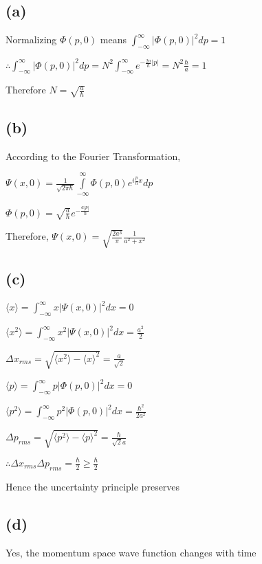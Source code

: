 \documentclass[12pt]{article}
\begin{document}
\begin{spacing}{2.0}
\section{} %
\subsection*{(a)}
Normalizing $\Phi(p,0)$ means $\int_{-\infty}^{\infty} |\Phi(p,0)|^2 dp=1$

$\therefore \int_{-\infty}^{\infty} |\Phi(p,0)|^2 dp= N^2\int_{-\infty}^{\infty}e^{-\frac{2a}{\hbar}|p|}= N^2\frac{\hbar}{a}=1$

Therefore $N=\sqrt{\frac{a}{\hbar}}$

\subsection*{(b)}
According to the Fourier Transformation,

$\Psi(x,0) = \frac{1}{\sqrt{2\pi \hbar}} \int\limits_{-\infty}^{\infty} \Phi(p,0) e^{i\frac{p}{\hbar}x} dp$

$\Phi(p,0)=\sqrt{\frac{a}{\hbar }} e^{-\frac{a \left| p\right| }{\hbar }}$

Therefore, $\Psi(x,0)= \sqrt{\frac{2a^3}{\pi}}\frac{1}{a^2+x^2}$

\subsection*{(c)}
$\langle x \rangle=\int_{-\infty}^{\infty} x|\Psi(x,0)|^2 dx=0$

$\langle x^2 \rangle=\int_{-\infty}^{\infty} x^2|\Psi(x,0)|^2 dx=\frac{a^2}{2}$

$\Delta x_{rms}=\sqrt{\langle x^2 \rangle- \langle x \rangle^2}= \frac{a}{\sqrt{2}}$

$\langle p \rangle=\int_{-\infty}^{\infty} p|\Phi(p,0)|^2 dx=0$

$\langle p^2 \rangle=\int_{-\infty}^{\infty} p^2|\Phi(p,0)|^2 dx=\frac{\hbar ^2}{2 a^2}$

$\Delta p_{rms}=\sqrt{\langle p^2 \rangle- \langle p \rangle^2}= \frac{\hbar}{\sqrt{2}a}$

$\therefore \Delta x_{rms} \Delta p_{rms}= \frac{\hbar}{2}\ge \frac{\hbar}{2}$

Hence the uncertainty principle preserves

\subsection*{(d)}
Yes, the momentum space wave function changes with time


\end{spacing}
\end{document}
